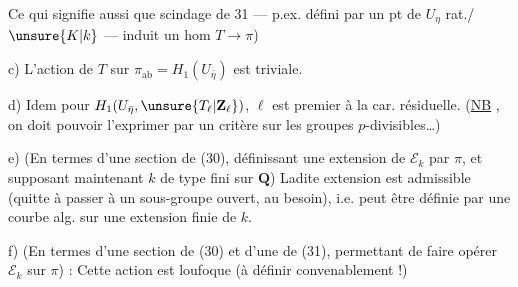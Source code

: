 Ce qui signifie aussi que   scindage de 31 --- p.ex. défini par un pt de $U_\eta$ rat./$\unsure{K|k}$ --- induit un hom $T\longrightarrow\pi$)

\noindent c) L'action de $T$ sur $\pi_{\mathrm{ab}}=H_1(U_{\bar\eta})$ est triviale.

\noindent d) Idem pour $H_1(U_{\bar\eta},\unsure{T_\ell|\mathbf Z_\ell})$,  $\ell$ est premier à la car. résiduelle. (\uline{NB}  , on doit pouvoir l'exprimer par un critère sur les groupes $p$-divisibles\ldots)

\noindent e) (En termes d'une section de (30), définissant une extension de $\mathcal E_k$ par $\pi$, et supposant maintenant $k$ de type fini sur $\mathbf Q$) Ladite extension est admissible (quitte à passer à un sous-groupe ouvert,  au besoin), i.e. peut être définie par une courbe alg. sur  une extension finie de $k$.

\noindent f) (En termes d'une section de (30) et d'une de (31), permettant de faire opérer $\mathcal E_k$ sur $\pi$) : Cette action est  loufoque (à définir convenablement !)

